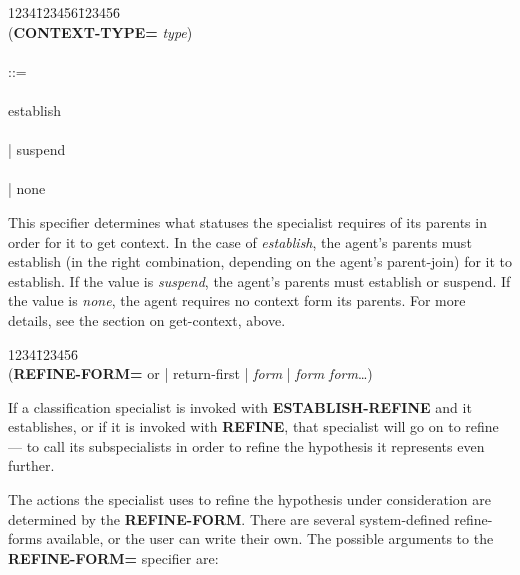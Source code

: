 \begin{tabbing}
1234\=123456\=123456\= \kill
\\
({\bf CONTEXT-TYPE=} {\it type\/}) \\
\\
 ::= \\
\\
\>\>\>establish \\
\\
\>\>\>| suspend \\
\\
\>\>\>| none\\
\end{tabbing}
This specifier determines what statuses the specialist requires of
its parents in order for it to get context. In the case of {\it establish\/},
the agent's parents must establish (in the right combination, depending
on the agent's parent-join) for it to establish. If the value is
{\it suspend\/}, the agent's parents must establish or suspend. If the
value is {\it none}, the agent requires no context form its parents.
For more details, see the section on get-context, above.

\begin{tabbing}
1234\=123456\= \kill
\\
({\bf REFINE-FORM=} or | return-first | {\it form\/} | {\it form
form\/}\ldots) \\ 
\end{tabbing}
\label{user-defined refine forms}

If a classification specialist is invoked with {\bf ESTABLISH-REFINE}
and it establishes, or if it is invoked with {\bf REFINE}, that
specialist will go on to refine --- to call its subspecialists in
order to refine the hypothesis it represents even further.

The actions the specialist uses to refine the hypothesis under
consideration are determined by the {\bf REFINE-FORM}. There are
several system-defined refine-forms available, or the user can write
their own. The possible arguments to the {\bf REFINE-FORM=} specifier
are:

